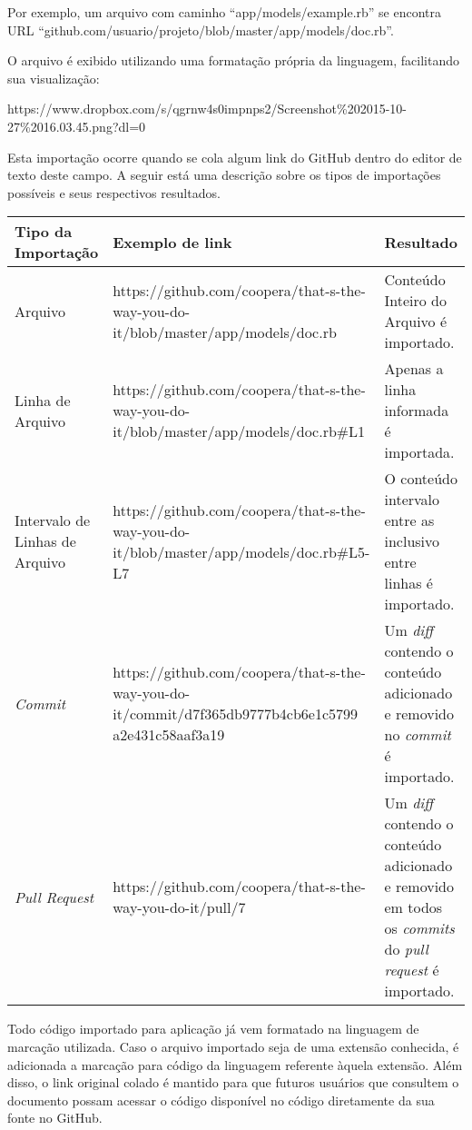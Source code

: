 Por exemplo, um arquivo com caminho ``app/models/example.rb'' se encontra URL ``github.com/usuario/projeto/blob/master/app/models/doc.rb''.

O arquivo é exibido utilizando uma formatação própria da linguagem, facilitando sua visualização:

https://www.dropbox.com/s/qgrnw4s0impnps2/Screenshot\%202015-10-27\%2016.03.45.png?dl=0


Esta importação ocorre quando se cola algum link do GitHub dentro do editor de texto deste campo. A seguir está uma descrição sobre os tipos de importações possíveis e seus respectivos resultados.

\begin{center}
    \begin{tabular}{| p{3cm} | p{7cm} | p{5cm} |}
    \hline
    Tipo da Importação & Exemplo de link & Resultado \\ \hline
    Arquivo & https://github.com/coopera/that-s-the-way-you-do-it/blob/master/app/models/doc.rb & Conteúdo Inteiro do Arquivo é importado. \\ \hline
    Linha de Arquivo & https://github.com/coopera/that-s-the-way-you-do-it/blob/master/app/models/doc.rb\#L1 & Apenas a linha informada é importada. \\ \hline
    Intervalo de Linhas de Arquivo & https://github.com/coopera/that-s-the-way-you-do-it/blob/master/app/models/doc.rb\#L5-L7 & O conteúdo intervalo entre as inclusivo entre linhas é importado. \\ \hline
    \textit{Commit} & https://github.com/coopera/that-s-the-way-you-do-it/commit/d7f365db9777b4cb6e1c5799 a2e431c58aaf3a19 & Um \textit{diff} contendo o conteúdo adicionado e removido no \textit{commit} é importado. \\ \hline
    \textit{Pull Request} & https://github.com/coopera/that-s-the-way-you-do-it/pull/7 & Um \textit{diff} contendo o conteúdo adicionado e removido em todos os \textit{commits} do \textit{pull request} é importado.  \\ \hline
    \end{tabular}
\end{center}


Todo código importado para aplicação já vem formatado na linguagem de marcação utilizada. Caso o arquivo importado seja de uma extensão conhecida, é adicionada a marcação para código da linguagem referente àquela extensão. Além disso, o link original colado é mantido para que futuros usuários que consultem o documento possam acessar o código disponível no código diretamente da sua fonte no GitHub.

